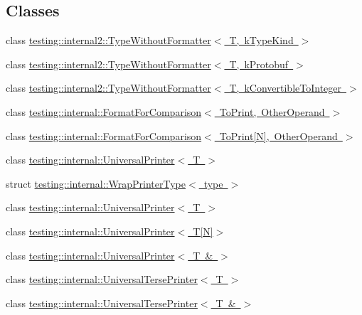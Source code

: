 \subsection*{Classes}
\begin{DoxyCompactItemize}
\item 
class \mbox{\hyperlink{classtesting_1_1internal2_1_1_type_without_formatter}{testing\+::internal2\+::\+Type\+Without\+Formatter$<$ T, k\+Type\+Kind $>$}}
\item 
class \mbox{\hyperlink{classtesting_1_1internal2_1_1_type_without_formatter_3_01_t_00_01k_protobuf_01_4}{testing\+::internal2\+::\+Type\+Without\+Formatter$<$ T, k\+Protobuf $>$}}
\item 
class \mbox{\hyperlink{classtesting_1_1internal2_1_1_type_without_formatter_3_01_t_00_01k_convertible_to_integer_01_4}{testing\+::internal2\+::\+Type\+Without\+Formatter$<$ T, k\+Convertible\+To\+Integer $>$}}
\item 
class \mbox{\hyperlink{classtesting_1_1internal_1_1_format_for_comparison}{testing\+::internal\+::\+Format\+For\+Comparison$<$ To\+Print, Other\+Operand $>$}}
\item 
class \mbox{\hyperlink{classtesting_1_1internal_1_1_format_for_comparison_3_01_to_print[_n]_00_01_other_operand_01_4}{testing\+::internal\+::\+Format\+For\+Comparison$<$ To\+Print\mbox{[}\+N\mbox{]}, Other\+Operand $>$}}
\item 
class \mbox{\hyperlink{classtesting_1_1internal_1_1_universal_printer}{testing\+::internal\+::\+Universal\+Printer$<$ T $>$}}
\item 
struct \mbox{\hyperlink{structtesting_1_1internal_1_1_wrap_printer_type}{testing\+::internal\+::\+Wrap\+Printer\+Type$<$ type $>$}}
\item 
class \mbox{\hyperlink{classtesting_1_1internal_1_1_universal_printer}{testing\+::internal\+::\+Universal\+Printer$<$ T $>$}}
\item 
class \mbox{\hyperlink{classtesting_1_1internal_1_1_universal_printer_3_01_t[_n]_4}{testing\+::internal\+::\+Universal\+Printer$<$ T\mbox{[}\+N\mbox{]}$>$}}
\item 
class \mbox{\hyperlink{classtesting_1_1internal_1_1_universal_printer_3_01_t_01_6_01_4}{testing\+::internal\+::\+Universal\+Printer$<$ T \& $>$}}
\item 
class \mbox{\hyperlink{classtesting_1_1internal_1_1_universal_terse_printer}{testing\+::internal\+::\+Universal\+Terse\+Printer$<$ T $>$}}
\item 
class \mbox{\hyperlink{classtesting_1_1internal_1_1_universal_terse_printer_3_01_t_01_6_01_4}{testing\+::internal\+::\+Universal\+Terse\+Printer$<$ T \& $>$}}

\end{DoxyCompactItemize}
